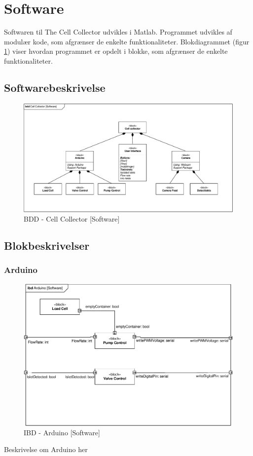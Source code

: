\section{Software}
Softwaren til The Cell Collector udvikles i Matlab. Programmet udvikles af modulær kode, som afgrænser de enkelte funktionaliteter. Blokdiagrammet (figur \ref{fig:bdd_software}) viser hvordan programmet er opdelt i blokke, som afgrænser de enkelte funktionaliteter. 
\subsection{Softwarebeskrivelse}
\begin{figure}[H]
	\centering
	\includegraphics[width=1\textwidth]{billeder/BDD_Software-crop.pdf}
	\caption{BDD - Cell Collector [Software]}
	\label{fig:bdd_software}
\end{figure}


\subsection{Blokbeskrivelser}
\subsubsection{Arduino}
\begin{figure}[H]
	\centering
	\includegraphics[width=1\textwidth]{billeder/IBD_Software_Arduino-crop.pdf}
	\caption{IBD - Arduino [Software]}
	\label{fig:ibd_software_arduino}
\end{figure}
Beskrivelse om Arduino her
